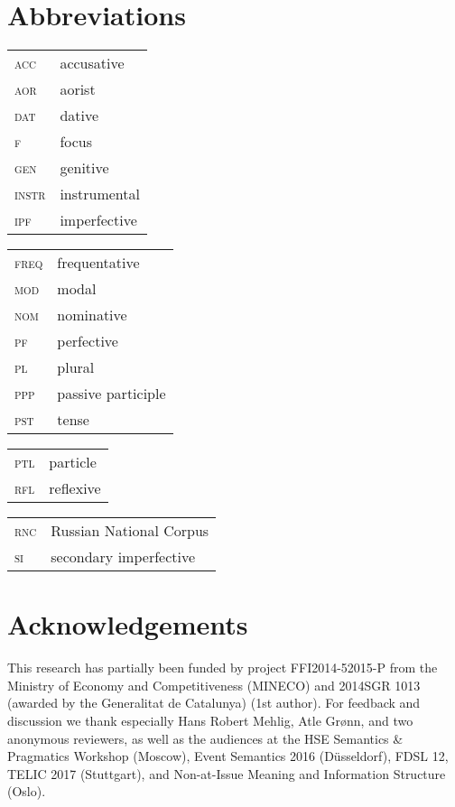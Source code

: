 \documentclass[output=paper,modfonts,newtxmath,hidelinks
\ChapterDOI{10.5281/zenodo.2545513}
]{langscibook}
\begin{document}
\largerpage[2]
\section*{Abbreviations}

\begin{tabularx}{.5\textwidth}{@{}lQ@{}}
\textsc{acc}&{accusative}\\
\textsc{aor}&aorist\\
\textsc{dat}&{dative}\\
\textsc{f}&focus\\
\textsc{gen}&{genitive}\\
\textsc{instr}&{instrumental}\\
\textsc{ipf}&{imperfective}\\
\end{tabularx}%
\begin{tabularx}{.5\textwidth}{@{}lQ@{}}
\textsc{freq}&frequentative\\
\textsc{mod}&modal\\
\textsc{nom}&{nominative}\\
\textsc{pf}&{perfective}\\
\textsc{pl}&{plural}\\
\textsc{ppp}& passive {participle}\\
\textsc{pst}&{ tense}\\
\end{tabularx}%

\begin{tabularx}{.5\textwidth}{@{}lQ@{}}
\textsc{ptl}&particle\\
\textsc{rfl}&reflexive\\
\end{tabularx}%
\begin{tabularx}{.5\textwidth}{@{}lQ@{}}
\textsc{rnc}&{Russian} National Corpus\\
\textsc{si}&secondary {imperfective}\\
\end{tabularx}


\section*{Acknowledgements}

This research has partially been funded by project FFI2014-52015-P from the Ministry of Economy and Competitiveness (MINECO) and 2014SGR 1013 (awarded by the Generalitat de Catalunya) (1st author). For feedback and discussion we thank especially Hans Robert Mehlig, Atle Grønn, and  two anonymous reviewers, as well as the audiences at the HSE Semantics \& Pragmatics Workshop (Moscow), Event Semantics 2016 (D\"{u}sseldorf), FDSL 12, TELIC 2017 (Stuttgart), and Non-at-Issue Meaning and Information Structure (Oslo).

\largerpage
\sloppy\printbibliography[heading=subbibliography,notkeyword=this]
\end{document}
